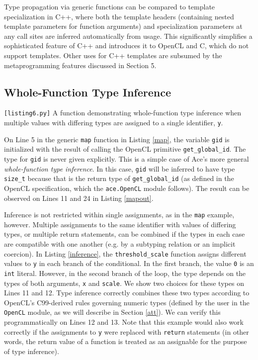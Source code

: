 \documentclass[9pt,preprint]{sigplanconf}
\begin{document}
Type propagation via generic functions can be compared to template specialization in C++, where both the template headers (containing nested template parameters for function arguments) and specialization parameters at any call sites are inferred automatically from usage. This significantly simplifies a sophisticated feature of C++ and introduces it to OpenCL and C, which do not support templates. Other uses for C++ templates are subsumed by the metaprogramming features discussed in Section 5.

\subsection{Whole-Function Type Inference}
\begin{codelisting}

\caption{\texttt{[listing6.py]} A function demonstrating whole-function type inference when multiple values with differing types are assigned to a single identifier, \texttt{y}.}
\label{inference}
\end{codelisting}

On Line 5 in the generic \verb|map| function in Listing \ref{map}, the variable \verb|gid| is initialized with the result of calling the OpenCL primitive \verb|get_global_id|.  The type for \verb|gid| is never given explicitly. This is a simple case of Ace's more general {\em whole-function type inference}. In this case, \verb|gid| will be inferred to have type \verb|size_t| because that is the return type of \verb|get_global_id| (as defined in the OpenCL specification, which the \verb|ace.OpenCL| module follows). The result can be observed on Lines 11 and 24 in Listing \ref{mapout}. 

Inference is not restricted within single assignments, as in the \verb|map| example, however. Multiple assignments to the same identifier with values of differing types, or multiple return statements, can be combined if the types in each case are compatible with one another (e.g. by a subtyping relation or an implicit coercion). In Listing \ref{inference}, the \verb|threshold_scale| function assigns different values to \verb|y| in each branch of the conditional. In the first branch, the value \verb|0| is an \verb|int| literal. However, in the second branch of the loop, the type depends on the types of both arguments, \verb|x| and \verb|scale|. We show two choices for these types on Lines 11 and 12. Type inference correctly combines these two types according to OpenCL's C99-derived rules governing numeric types (defined by the user in the \verb|OpenCL| module, as we will describe in Section \ref{att}). We can verify this programmatically on Lines 12 and 13. Note that this example would also work correctly if the assignments to \verb|y| were replaced with \verb|return| statements (in other words, the return value of a function is treated as an assignable for the purpose of type inference).
\end{document}
